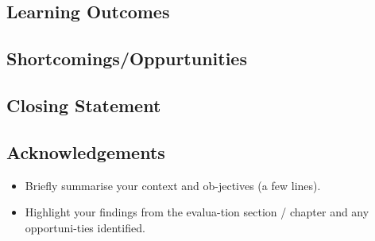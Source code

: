 \subsection{Learning Outcomes}
\subsection{Shortcomings/Oppurtunities}
\subsection{Closing Statement}
\subsection{Acknowledgements}

\begin{itemize}
\item Briefly summarise your context and ob-jectives (a few lines).
\item Highlight your findings from the evalua-tion section / chapter and any opportuni-ties identified.
\end{itemize}

